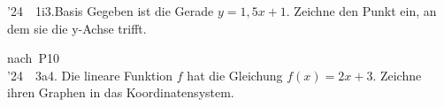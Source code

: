 \documentclass[11pt]{article}
\newcommand{\gpassend}[1]{\sbox{\gpbox}{#1}\ifdim\wd\gpbox>\linewidth\typeout{GPASSEND: verkleinert \the\wd\gpbox\space auf \the\linewidth}\resizebox{\linewidth}{!}{\usebox{\gpbox}}\else\usebox{\gpbox}\fi}
\newcommand{\pkt}{\textperiodcentered{}}
\begin{document}
\begin{pfaufg}{’24~\pkt{}~1i}{3.}{Basis}
Gegeben ist die Gerade $y = 1{,}5x + 1$. Zeichne den Punkt ein, an dem sie die y-Achse trifft.
\par\smallskip\noindent\begin{ksys}[xmin=-3,xmax=3,ymin=-3,ymax=3,karo=0.5]\end{ksys}\par
{}
\end{pfaufg}
\begin{pfaufg}{nach~P10\\’24~\pkt{}~3a}{4.}{}
Die lineare Funktion $f$ hat die Gleichung $f(x) = 2x + 3$. Zeichne ihren Graphen in das Koordinatensystem.
\par\smallskip\noindent\gpassend{\begin{ksys}[xmin=-4,xmax=4,ymin=-5,ymax=8,karo=0.5]\end{ksys}}\par
{}
\end{pfaufg}
\end{document}
